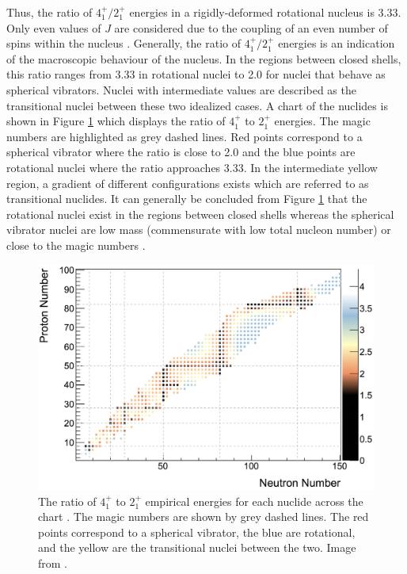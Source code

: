 Thus, the ratio of $4^+_1/2^+_1$ energies in a rigidly-deformed rotational nucleus is 3.33. Only even values of $J$ are considered due to the coupling of an even number of spins within the nucleus \cite{KraneText}. Generally, the ratio of $4^+_1/2^+_1$ energies is an indication of the macroscopic behaviour of the nucleus. In the regions between closed shells, this ratio ranges from 3.33 in rotational nuclei to 2.0 for nuclei that behave as spherical vibrators. Nuclei with intermediate values are described as the transitional nuclei between these two idealized cases. A chart of the nuclides is shown in Figure \ref{figure: 4 to 2 ratio across the chart} which displays the ratio of $4^+_1$ to $2^+_1$ energies. The magic numbers are highlighted as grey dashed lines. Red points correspond to a spherical vibrator where the ratio is close to 2.0 and the blue points are rotational nuclei where the ratio approaches 3.33. In the intermediate yellow region, a gradient of different configurations exists which are referred to as transitional nuclides. It can generally be concluded from Figure \ref{figure: 4 to 2 ratio across the chart} that the rotational nuclei exist in the regions between closed shells whereas the spherical vibrator nuclei are low mass (commensurate with low total nucleon number) or close to the magic numbers \cite{EvittsParse}. 

\begin{figure}[!ht]
  \centering
  \includegraphics[width=\textwidth]{theory_4to2_chart.png}
  \caption[The ratio of $4^+_1$ to $2^+_1$ empirical energies for each nuclide across the chart \cite{EvittsParse}.]{The ratio of $4^+_1$ to $2^+_1$ empirical energies for each nuclide across the chart \cite{EvittsParse}. The magic numbers are shown by grey dashed lines. The red points correspond to a spherical vibrator, the blue are rotational, and the yellow are the transitional nuclei between the two. Image from \cite{EvittsThesis}.}
  \label{figure: 4 to 2 ratio across the chart}
\end{figure}


